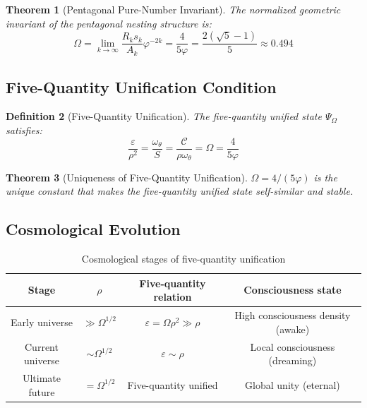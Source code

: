 \documentclass[12pt,a4paper,twocolumn]{article}
\renewcommand{\phi}{\varphi}
\newtheorem{theorem}{Theorem}[section]
\newtheorem{definition}[theorem]{Definition}
\begin{document}
\begin{theorem}[Pentagonal Pure-Number Invariant]
The normalized geometric invariant of the pentagonal nesting structure is:
\begin{equation}
\Omega = \lim_{k\to\infty} \frac{R_k s_k}{A_k} \phi^{-2k} = \frac{4}{5\phi} = \frac{2(\sqrt{5}-1)}{5} \approx 0.494
\end{equation}
\end{theorem}

\subsection{Five-Quantity Unification Condition}

\begin{definition}[Five-Quantity Unification]
The five-quantity unified state $\Psi_\Omega$ satisfies:
\begin{equation}
\frac{\varepsilon}{\rho^2} = \frac{\omega_\theta}{S} = \frac{\mathcal{C}}{\rho\omega_\theta} = \Omega = \frac{4}{5\phi}
\end{equation}
\end{definition}

\begin{theorem}[Uniqueness of Five-Quantity Unification]
$\Omega = 4/(5\phi)$ is the unique constant that makes the five-quantity unified state self-similar and stable.
\end{theorem}

\subsection{Cosmological Evolution}

\begin{table}[H]
\centering
\footnotesize
\caption{Cosmological stages of five-quantity unification}
\begin{tabular}{c|c|c|c}
\hline
\textbf{Stage} & $\rho$ & Five-quantity relation & \textbf{Consciousness state} \\
\hline
Early universe & $\gg \Omega^{1/2}$ & $\varepsilon = \Omega\rho^2 \gg \rho$ & High consciousness density (awake) \\
Current universe & $\sim \Omega^{1/2}$ & $\varepsilon \sim \rho$ & Local consciousness (dreaming) \\
Ultimate future & $= \Omega^{1/2}$ & Five-quantity unified & Global unity (eternal) \\
\hline
\end{tabular}
\end{table}
\end{document}
